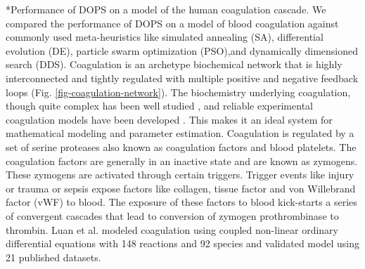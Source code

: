 \documentclass[12pt]{article}
\makeatletter
\renewcommand\subsection{\@startsection
	{subsection}{2}{0mm}
	{-0.05in}
	{-0.5\baselineskip}
	{\normalfont\normalsize\bfseries}}
\makeatother
\begin{document}
\subsection*{Performance of DOPS on a model of the human coagulation cascade.}
We compared the performance of DOPS on a model of blood coagulation against commonly used meta-heuristics like simulated annealing (SA), differential evolution (DE), particle swarm optimization (PSO),and dynamically dimensioned search (DDS). Coagulation is an archetype biochemical network that is highly interconnected and tightly regulated with multiple positive and negative feedback loops (Fig. \ref{fig-coagulation-network}). The biochemistry underlying coagulation, though quite complex has been well studied \cite{mann2003dynamics,mann2003all,mann2003thrombin,vogler2009contact,diamond2013systems,fogelson2005coagulation,anand2003model}, and reliable experimental coagulation models have been developed \cite{hockin2002model,chatterjee2010systems,mann2006models,luan2007computationally}. This makes it an ideal system for mathematical modeling and parameter estimation. Coagulation is regulated by a set of serine proteases also known as coagulation factors and blood platelets. The coagulation factors are generally in an inactive state and are known as zymogens. These zymogens are activated through certain triggers. Trigger events like injury or trauma or sepsis expose factors like collagen, tissue factor and von Willebrand factor (vWF) to blood. The exposure of these factors to blood kick-starts a series of convergent cascades that lead to conversion of zymogen prothrombinase to thrombin.   Luan et al. modeled coagulation using coupled non-linear ordinary differential equations with 148 reactions and 92 species \cite{luan2007computationally} and validated model using 21 published datasets.
\end{document}
